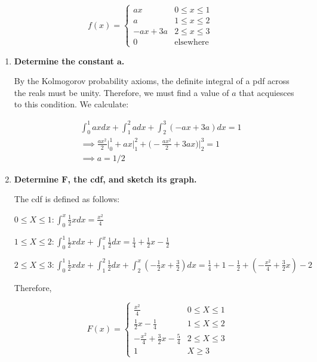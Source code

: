 \documentclass[10pt, oneside]{article}
\begin{document}
\begin{enumerate}[label=4.\arabic*]
\[ f(x) = \begin{cases}
  ax  & 0 \leq x \leq 1 \\
  a & 1 \leq x \leq 2 \\
  -ax + 3a & 2 \leq x \leq 3 \\
  0 & \text{elsewhere}
\end{cases} \]

	\begin{enumerate}
	\item  \begin{tcolorbox}[
	  colback=Cerulean!5!white,
	  colframe=Cerulean!75!black]
	\textbf{Determine the constant $\bm{a}$.}
	\end{tcolorbox}
	
	By the Kolmogorov probability axioms, the definite integral of a pdf across the reals must be unity. Therefore, we must find a value of $a$ that acquiesces to this condition. We calculate:
	
	\begin{align*}
	&\int^1_0 ax dx + \int^2_1 adx + \int^3_2 (-ax + 3a)dx = 1 \\
	&\implies \frac{ax^2}{2} \Big|^1_0 + ax \Big|^2_1 + \Big( -\frac{ax^2}{2} + 3ax \Big) \Big|^3_2 = 1 \\
	&\implies \boxed{a = 1/2}
	\end{align*}
	
	\item  \begin{tcolorbox}[
	  colback=Cerulean!5!white,
	  colframe=Cerulean!75!black]
	\textbf{Determine $\bm{F}$, the cdf, and sketch its graph.}
	\end{tcolorbox}
	
	The cdf is defined as follows:
	
	$0 \leq X \leq 1: \int^x_0 \frac{1}{2}x dx = \frac{x^2}{4}$
	
	$1 \leq X \leq 2: \int^1_0 \frac{1}{2}x dx + \int^x_1 \frac{1}{2} dx = \frac{1}{4} + \frac{1}{2}x - \frac{1}{2}$
	
	$2 \leq X \leq 3: \int^1_0 \frac{1}{2}x dx + \int^2_1 \frac{1}{2} dx + \int^x_2 (-\frac{1}{2} x + \frac{3}{2} ) dx = \frac{1}{4} + 1 - \frac{1}{2} + ( -\frac{x^2}{4} + \frac{3}{2}x ) - 2$
	
	Therefore,
	
	\[ F(x) = \begin{cases}
  \frac{x^2}{4}  & 0 \leq X \leq 1 \\
  \frac{1}{2}x - \frac{1}{4} & 1 \leq X \leq 2 \\
  -\frac{x^2}{4} + \frac{3}{2}x - \frac{5}{4} & 2 \leq X \leq 3 \\
  1 & X \geq 3
\end{cases} \]


\end{enumerate}
\end{enumerate}
\end{document}
